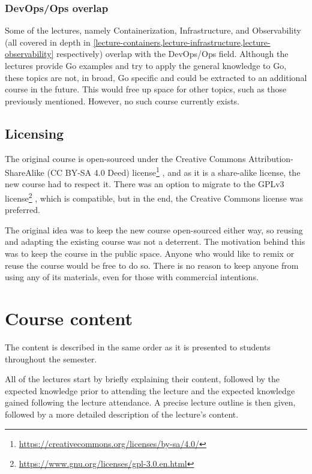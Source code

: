 \documentclass[
  digital,
  color,
  oneside,
  nosansbold,
  nocolorbold,
  nolof,
  nolot,
]{fithesis4}
\begin{document}
\subsection{DevOps/Ops overlap}\label{devops-overlap}

Some of the lectures, namely Containerization, Infrastructure, and Observability (all covered in depth in \cref{lecture-containers,lecture-infrastructure,lecture-observability} respectively) overlap with the DevOps/Ops field. Although the lectures provide Go examples and try to apply the general knowledge to Go, these topics are not, in broad, Go specific and could be extracted to an additional course in the future. This would free up space for other topics, such as those previously mentioned. However, no such course currently exists.

\section{Licensing}

The original course is open-sourced under the Creative Commons Attribution-ShareAlike (CC BY-SA 4.0 Deed) license\footnote{\url{https://creativecommons.org/licenses/by-sa/4.0/}}
, and as it is a share-alike license, the new course had to respect it. There was an option to migrate to the GPLv3 license\footnote{\url{https://www.gnu.org/licenses/gpl-3.0.en.html}}
, which is compatible, but in the end, the Creative Commons license was preferred.

The original idea was to keep the new course open-sourced either way, so reusing and adapting the existing course was not a deterrent. The motivation behind this was to keep the course in the public space. Anyone who would like to remix or reuse the course would be free to do so. There is no reason to keep anyone from using any of its materials, even for those with commercial intentions.

\chapter{Course content}\label{chapter-content}

The content is described in the same order as it is presented to students throughout the semester.

All of the lectures start by briefly explaining their content, followed by the expected knowledge prior to attending the lecture and the expected knowledge gained following the lecture attendance. A precise lecture outline is then given, followed by a more detailed description of the lecture's content.
\end{document}
